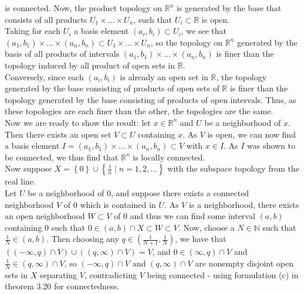 \documentclass[a4paper]{article}
\begin{document}
    is connected.
    Now, the product topology on $\mathbb{R}^{n}$ is generated by
    the base that consists of all products
    $U_1 \times \ldots \times U_n$, such that $U_i \subset \mathbb{R}$ is
    open.\\
    Taking for each $U_i$ a basis element $(a_i, b_i) \subset U_i$, we see that
    $(a_1, b_1) \times \ldots \times (a_n , b_n) \subset U_1 \times \ldots
    \times U_n$, so the topology on $\mathbb{R}^{n}$ generated by the basis
    of all products of intervals
    $(a_1, b_1) \times \ldots \times (a_n, b_n)$ is finer than the topology
    induced by all product of open sets in $\mathbb{R}$.\\
    Conversely, since each $(a_i, b_i)$ is already an open set in $\mathbb{R}$,
    the topology generated by the base consisting of products of open sets of
    $\mathbb{R}$ is finer than the topology generated by the base consisting of
    products of open intervals. Thus, as these topologies are each finer than
    the other, the topologies are the same.\\
    \linebreak
    Now we are ready to show the result: let $x \in \mathbb{R}^{n}$ and $U$ be
    a neighborhood of $x$. Then there exists an open set 
    $V \subset U$ containing $x$. As $V$ is open, we can now find a basis
    element
    $ I= (a_1, b_1) \times \ldots \times (a_n ,b_n) \subset V$ with
    $x \in I$. As $I$ was shown to be connected, we thus find that
    $\mathbb{R}^{n}$ is locally connected.\\
    \linebreak
    Now suppose $X = \left\{ 0 \right\} \cup \left\{ \frac{1}{n} \mid 
    n = 1, 2, \ldots \right\} $ with the subspace topology from the real
    line.\\
    Let $U$ be a neighborhood of $0$, and suppose there exists a connected
    neighborhood $V$ of $0$ which is contained in $U$. As $V$ is
    a neighborhood, there exists an open neighborhood $W \subset V$ of $0$ and
    thus we can find some interval $(a,b)$ containing  $0$ such that
    $0 \in (a,b) \cap X \subset W \subset V$. Now, choose a
    $N \in \mathbb{N}$ such that $\frac{1}{N} \in (a,b)$. Then
    choosing any $q \in \left( \frac{1}{N+1}, \frac{1}{N} \right) $, we have
    that
    $ \left( (-\infty, q) \cap V \right) \cup
    \left( (q, \infty) \cap V \right) = V$, and
    $0 \in (\infty, q) \cap V$ and $\frac{1}{N} \in (q, \infty) \cap V$, so
    $(-\infty, q)\cap V$ and $(q, \infty) \cap V$ are nonempty disjoint open sets
    in $X$ separating $V$, contradicting $V$ being connected - using
    formulation (c) in theorem 3.20 for connectedness.
          
\end{document}
